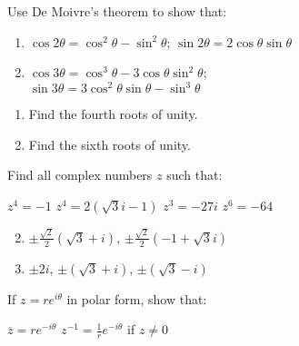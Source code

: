 \begin{multicols}{2}
\begin{ex}
Use De Moivre's theorem to show that:

\begin{enumerate}[label={\alph*.}]
\item $\cos 2\theta = \cos^{2} \theta - \sin^{2} \theta$; $\sin 2\theta = 2 \cos \theta \sin \theta$

\item $\cos 3\theta = \cos^{3} \theta - 3 \cos \theta \sin^{2} \theta$; \\
$\sin 3\theta = 3 \cos^2 \theta \sin \theta - \sin^3 \theta$

\end{enumerate}
\end{ex}

\begin{ex}
\begin{enumerate}[label={\alph*.}]
\item Find the fourth roots of unity.

\item Find the sixth roots of unity.

\end{enumerate}
\end{ex}

\begin{ex}
Find all complex numbers $z$ such that:

\begin{exenumerate}
\exitem $z^{4} = -1$
\exitem $z^{4} = 2(\sqrt{3}i - 1)$
\exitem $z^{3} = -27i$
\exitem $z^{6} = -64$
\end{exenumerate}
\begin{sol}
\begin{enumerate}[label={\alph*.}]
\setcounter{enumi}{1}
\item $\pm \frac{\sqrt{2}}{2}(\sqrt{3}+i)$, $\pm \frac{\sqrt{2}}{2}(-1 + \sqrt{3}i)$


\setcounter{enumi}{3}
\item  $\pm 2i$, $\pm (\sqrt{3} +i)$, $\pm (\sqrt{3}-i)$


\end{enumerate}
\end{sol}
\end{ex}

\columnbreak
\begin{ex}
If $z = re^{i\theta}$ in polar form, show that:

\begin{exenumerate}
\exitem $\overline{z} = re^{-i\theta}$
\exitem $z^{-1}  = \frac{1}{r} e^{-i\theta}$ if  $z \neq 0 $
\end{exenumerate}
\end{ex}


\end{multicols}
